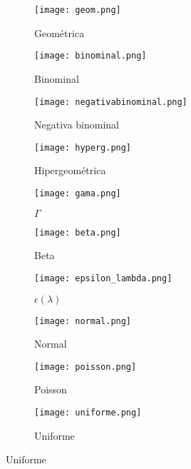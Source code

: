 \begin{figure}[H]
	\begin{subfigure}{.5\textwidth}\centering
		\texttt{[image: geom.png]}
		\caption{Geométrica}
	\end{subfigure}\begin{subfigure}{.5\textwidth}\centering
		\texttt{[image: binominal.png]}
		\caption{Binominal}
	\end{subfigure}
	
	\begin{subfigure}{.5\textwidth}\centering
		\texttt{[image: negativabinominal.png]}
		\caption{Negativa binominal}
	\end{subfigure}\begin{subfigure}{.5\textwidth}\centering
		\texttt{[image: hyperg.png]}
		\caption{Hipergeométrica}
	\end{subfigure}
	
	\begin{subfigure}{.5\textwidth}\centering
		\texttt{[image: gama.png]}
		\caption{$\Gamma$}
	\end{subfigure}\begin{subfigure}{.5\textwidth}\centering
		\texttt{[image: beta.png]}
		\caption{Beta}
	\end{subfigure}
	
	\begin{subfigure}{.5\textwidth}\centering
		\texttt{[image: epsilon\_lambda.png]}
		\caption{$\epsilon(\lambda)$}
	\end{subfigure}\begin{subfigure}{.5\textwidth}\centering
		\texttt{[image: normal.png]}
		\caption{Normal}
	\end{subfigure}
	
	\begin{subfigure}{.5\textwidth}\centering
		\texttt{[image: poisson.png]}
		\caption{Poisson}
	\end{subfigure}\begin{subfigure}{.5\textwidth}\centering
		\texttt{[image: uniforme.png]}
		\caption{Uniforme}
	\end{subfigure}
\end{figure}\cite{bala20}